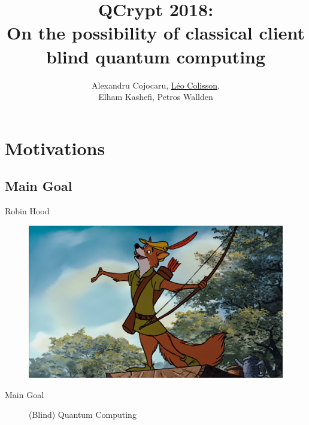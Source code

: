 \documentclass[]{beamer}
\title[QFactory and classical blind quantum computing]{QCrypt 2018:\\On the possibility of classical client blind quantum computing}
\author[A. Cojocaru, L. Colisson, E. Kashefi, P. Wallden]{Alexandru Cojocaru, \underline{Léo Colisson},\\ Elham Kashefi, Petros Wallden}
\begin{document}

\begin{frame}
  \titlepage
\end{frame}



\section{Motivations}

\subsection{Main Goal}

\begin{frame}{Robin Hood}
  \begin{figure}[ht]
    \centering
    \includegraphics[width=.8\textwidth]{figures/robin_hood.png}
  \end{figure}
\end{frame}


\begin{frame}{Main Goal}
  \begin{figure}[ht]
    \centering
    \caption{(Blind) Quantum Computing}
  \end{figure}
\end{frame}

\end{document}
